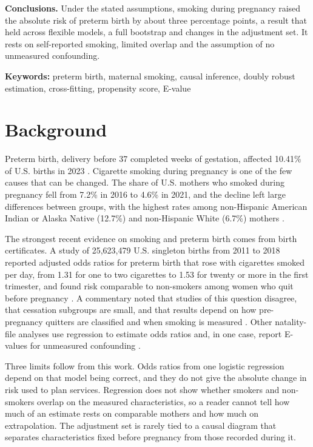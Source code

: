 \documentclass[11pt,letterpaper]{article}
\begin{document}
\textbf{Conclusions.} Under the stated assumptions, smoking during pregnancy raised the absolute risk of preterm birth by about three percentage points, a result that held across flexible models, a full bootstrap and changes in the adjustment set. It rests on self-reported smoking, limited overlap and the assumption of no unmeasured confounding.

\textbf{Keywords:} preterm birth, maternal smoking, causal inference, doubly robust estimation, cross-fitting, propensity score, E-value

\section*{Background}

Preterm birth, delivery before 37 completed weeks of gestation, affected 10.41\% of U.S. births in 2023 \cite{martin2024}. Cigarette smoking during pregnancy is one of the few causes that can be changed. The share of U.S. mothers who smoked during pregnancy fell from 7.2\% in 2016 to 4.6\% in 2021, and the decline left large differences between groups, with the highest rates among non-Hispanic American Indian or Alaska Native (12.7\%) and non-Hispanic White (6.7\%) mothers \cite{martin2023}.

The strongest recent evidence on smoking and preterm birth comes from birth certificates. A study of 25,623,479 U.S. singleton births from 2011 to 2018 reported adjusted odds ratios for preterm birth that rose with cigarettes smoked per day, from 1.31 for one to two cigarettes to 1.53 for twenty or more in the first trimester, and found risk comparable to non-smokers among women who quit before pregnancy \cite{liu2020}. A commentary noted that studies of this question disagree, that cessation subgroups are small, and that results depend on how pre-pregnancy quitters are classified and when smoking is measured \cite{stock2020}. Other natality-file analyses use regression to estimate odds ratios and, in one case, report E-values for unmeasured confounding \cite{kondracki2020}.

Three limits follow from this work. Odds ratios from one logistic regression depend on that model being correct, and they do not give the absolute change in risk used to plan services. Regression does not show whether smokers and non-smokers overlap on the measured characteristics, so a reader cannot tell how much of an estimate rests on comparable mothers and how much on extrapolation. The adjustment set is rarely tied to a causal diagram that separates characteristics fixed before pregnancy from those recorded during it.
\end{document}
